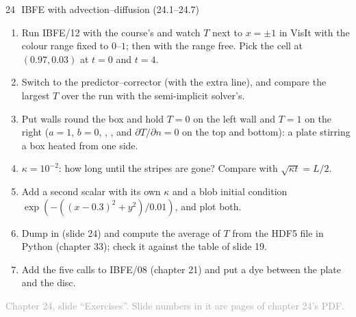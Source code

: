 \documentclass[aspectratio=169,11pt]{beamer}
\newcommand{\sourcecredit}[1]{\vfill\begin{flushright}\tiny\textcolor{DarkGray}{#1}\end{flushright}}
\begin{document}
\begin{frame}{24\,\textbullet\ IBFE with advection--diffusion (24.1--24.7)}
\label{fr:c24x1}
\footnotesize
\begin{enumerate}
  \item[24.1] Run IBFE/12 with the course's  and watch $T$ next to $x = \pm1$ in VisIt with the colour range fixed to $0$--$1$; then with the range free. Pick the cell at $(0.97, 0.03)$ at $t = 0$ and $t = 4$.
  \item[24.2] Switch to the predictor--corrector (with the extra line), and compare the largest $T$ over the run with the semi-implicit solver's.
  \item[24.3] Put walls round the box and hold $T = 0$ on the left wall and $T = 1$ on the right ($a = 1$, $b = 0$, , , and $\partial T/\partial n = 0$ on the top and bottom): a plate stirring a box heated from one side.
  \item[24.4] $\kappa = 10^{-2}$: how long until the stripes are gone? Compare with $\sqrt{\kappa t} = L/2$.
  \item[24.5] Add a second scalar  with its own $\kappa$ and a blob initial condition $\exp(-((x-0.3)^2 + y^2)/0.01)$, and plot both.
  \item[24.6] Dump  in  (slide 24) and compute the average of $T$ from the HDF5 file in Python (chapter 33); check it against the table of slide 19.
  \item[24.7] Add the five calls to IBFE/08 (chapter 21) and put a dye between the plate and the disc.
\end{enumerate}
\sourcecredit{Chapter 24, slide ``Exercises''. Slide numbers in it are pages of chapter 24's PDF.}
\end{frame}
\end{document}
